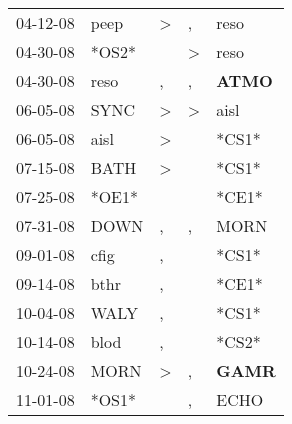 \begin{supertabular}{p{0.07\textwidth}p{0.06\textwidth}p{0.02\textwidth}p{0.02\textwidth}p{0.06\textwidth}}
          04-12-08\textsuperscript{} &           peep\textsuperscript{} &     \textgreater &                , &           reso\textsuperscript{} \\
          04-30-08\textsuperscript{} &                            *OS2* &                  &     \textgreater &           reso\textsuperscript{} \\
          04-30-08\textsuperscript{} &           reso\textsuperscript{} &                , &                , &  \textbf{ATMO\textsuperscript{}} \\
          06-05-08\textsuperscript{} &           SYNC\textsuperscript{} &     \textgreater &     \textgreater &           aisl\textsuperscript{} \\
          06-05-08\textsuperscript{} &           aisl\textsuperscript{} &     \textgreater &                  &                            *CS1* \\
          07-15-08\textsuperscript{} &           BATH\textsuperscript{} &     \textgreater &                  &                            *CS1* \\
          07-25-08\textsuperscript{} &                            *OE1* &                  &                  &                            *CE1* \\
          07-31-08\textsuperscript{} &           DOWN\textsuperscript{} &                , &                , &           MORN\textsuperscript{} \\
          09-01-08\textsuperscript{} &           cfig\textsuperscript{} &                , &                  &                            *CS1* \\
          09-14-08\textsuperscript{} &           bthr\textsuperscript{} &                , &                  &                            *CE1* \\
          10-04-08\textsuperscript{} &           WALY\textsuperscript{} &                , &                  &                            *CS1* \\
          10-14-08\textsuperscript{} &           blod\textsuperscript{} &                , &                  &                            *CS2* \\
          10-24-08\textsuperscript{} &           MORN\textsuperscript{} &     \textgreater &                , &  \textbf{GAMR\textsuperscript{}} \\
          11-01-08\textsuperscript{} &                            *OS1* &                  &                , &           ECHO\textsuperscript{} \\

\end{supertabular}

